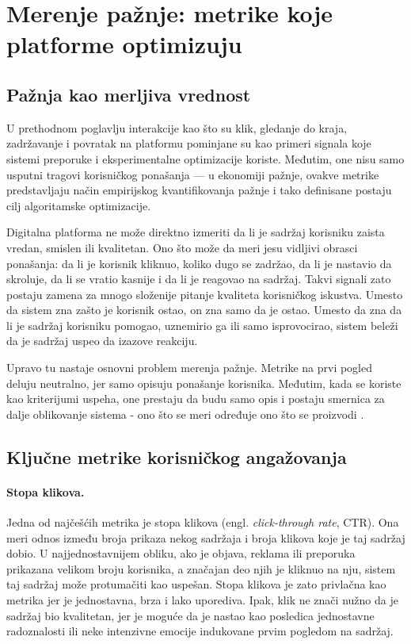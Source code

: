 \section{Merenje pažnje: metrike koje platforme optimizuju}

\subsection{Pažnja kao merljiva vrednost}

U prethodnom poglavlju interakcije kao što su klik, gledanje do kraja, zadržavanje i povratak na platformu pominjane su kao primeri signala koje sistemi preporuke i eksperimentalne optimizacije koriste. Međutim, one nisu samo usputni tragovi korisničkog ponašanja — u ekonomiji pažnje, ovakve metrike predstavljaju način empirijskog kvantifikovanja pažnje i tako definisane postaju cilj algoritamske optimizacije.

Digitalna platforma ne može direktno izmeriti da li je sadržaj korisniku zaista vredan, smislen ili kvalitetan. Ono što može da meri jesu vidljivi obrasci ponašanja: da li je korisnik kliknuo, koliko dugo se zadržao, da li je nastavio da skroluje, da li se vratio kasnije i da li je reagovao na sadržaj. Takvi signali zato postaju zamena za mnogo složenije pitanje kvaliteta korisničkog iskustva. Umesto da sistem zna zašto je korisnik ostao, on zna samo da je ostao. Umesto da zna da li je sadržaj korisniku pomogao, uznemirio ga ili samo isprovocirao, sistem beleži da je sadržaj uspeo da izazove reakciju.

Upravo tu nastaje osnovni problem merenja pažnje. Metrike na prvi pogled deluju neutralno, jer samo opisuju ponašanje korisnika. Međutim, kada se koriste kao kriterijumi uspeha, one prestaju da budu samo opis i postaju smernica za dalje oblikovanje sistema - ono što se meri određuje ono što se proizvodi \cite{wu2017returning}.

\subsection{Ključne metrike korisničkog angažovanja}

\paragraph{Stopa klikova.}
Jedna od najčešćih metrika je stopa klikova (engl. \textit{click-through rate}, CTR). Ona meri odnos između broja prikaza nekog sadržaja i broja klikova koje je taj sadržaj dobio. U najjednostavnijem obliku, ako je objava, reklama ili preporuka prikazana velikom broju korisnika, a značajan deo njih je kliknuo na nju, sistem taj sadržaj može protumačiti kao uspešan. Stopa klikova je zato privlačna kao metrika jer je jednostavna, brza i lako uporediva. Ipak, klik ne znači nužno da je sadržaj bio kvalitetan, jer je moguće da je nastao kao posledica jednostavne radoznalosti ili neke intenzivne emocije indukovane prvim pogledom na sadržaj.

